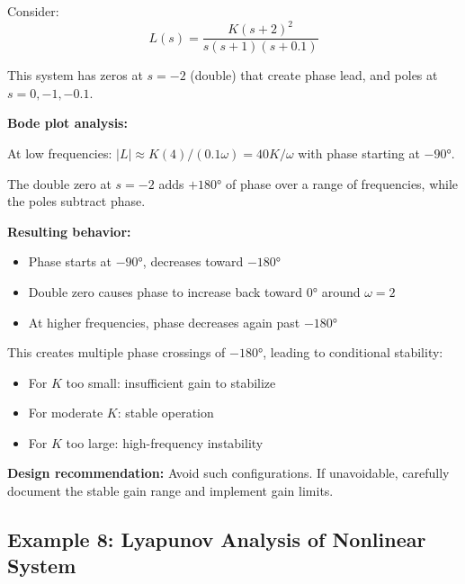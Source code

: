 \begin{example}
\label{ex:conditional}
Consider:
\begin{equation}
L(s) = \frac{K(s+2)^2}{s(s+1)(s+0.1)}
\end{equation}

This system has zeros at $s = -2$ (double) that create phase lead, and poles at $s = 0, -1, -0.1$.

\textbf{Bode plot analysis:}

At low frequencies: $|L| \approx K(4)/(0.1\omega) = 40K/\omega$ with phase starting at $-90°$.

The double zero at $s = -2$ adds $+180°$ of phase over a range of frequencies, while the poles subtract phase.

\textbf{Resulting behavior:}
\begin{itemize}
    \item Phase starts at $-90°$, decreases toward $-180°$
    \item Double zero causes phase to increase back toward $0°$ around $\omega = 2$
    \item At higher frequencies, phase decreases again past $-180°$
\end{itemize}

This creates multiple phase crossings of $-180°$, leading to conditional stability:

\begin{itemize}
    \item For $K$ too small: insufficient gain to stabilize
    \item For moderate $K$: stable operation
    \item For $K$ too large: high-frequency instability
\end{itemize}

\textbf{Design recommendation:} Avoid such configurations. If unavoidable, carefully document the stable gain range and implement gain limits.
\end{example}

\subsection{Example 8: Lyapunov Analysis of Nonlinear System}

